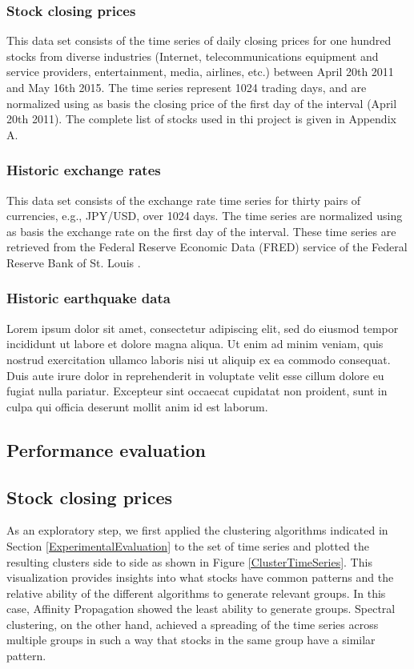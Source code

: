 \documentclass{article}
\begin{document}
\subsubsection{Stock closing prices}

This data set consists of the time series of daily closing prices for one hundred stocks from diverse industries (Internet, telecommunications equipment and service providers, entertainment, media, airlines, etc.) between April 20th 2011 and May 16th 2015. The time series represent 1024 trading days, and are normalized using as basis the closing price of the first day of the interval (April 20th 2011). The complete list of stocks used in thi project is given in Appendix A.

\subsubsection{Historic exchange rates}

This data set consists of the exchange rate time series for thirty pairs of currencies, e.g., JPY/USD, over 1024 days. The time series are normalized using as basis the exchange rate on the first day of the interval. These time series are retrieved from the Federal Reserve Economic Data (FRED) service of the Federal Reserve Bank of St. Louis \cite{FRED15}.


\subsubsection{Historic earthquake data}
Lorem ipsum dolor sit amet, consectetur adipiscing elit, sed do eiusmod tempor incididunt ut labore et dolore magna aliqua. Ut enim ad minim veniam, quis nostrud exercitation ullamco laboris nisi ut aliquip ex ea commodo consequat. Duis aute irure dolor in reprehenderit in voluptate velit esse cillum dolore eu fugiat nulla pariatur. Excepteur sint occaecat cupidatat non proident, sunt in culpa qui officia deserunt mollit anim id est laborum.

\subsection{Performance evaluation}


\subsection{Stock closing prices}

As an exploratory step, we first applied the clustering algorithms indicated in Section \ref{ExperimentalEvaluation} to the set of time series and plotted the resulting clusters side to side as shown in Figure \ref{ClusterTimeSeries}. This visualization provides insights into what stocks have common patterns and the relative ability of the different algorithms to generate relevant groups. In this case, Affinity Propagation showed the least ability to generate groups. Spectral clustering, on the other hand, achieved a spreading of the time series across multiple groups in such a way that stocks in the same group have a similar pattern.
\end{document}
